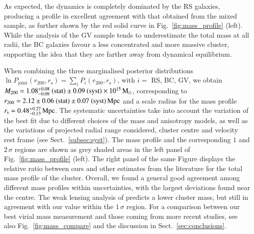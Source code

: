 \documentclass{aa}
\begin{document}
As expected, the dynamics is completely dominated by the RS galaxies, producing a profile in excellent agreement with that obtained from the mixed sample, as further shown by the red solid curve in Fig.~\ref{fig:mass_profile} (left). While the analysis of the GV sample tends to underestimate the total mass at all radii, the BC galaxies favour a less concentrated and more massive cluster, supporting the idea that they are farther away from dynamical equilibrium.


When combining the three marginalised posterior distributions $\ln P_\text{joint}(r_{200},r_\text{s}) = \sum_i  P_i(r_{200},r_\text{s})$, with $i = $ RS, BC, GV, we obtain $M_{200} = 1.08_{-0.09}^{+0.08}~({\rm stat}) \pm 0.09~({\rm syst}) \times 10^{15} \, \mathrm{M}_\odot $, corresponding to $r_{200}=2.12 \pm 0.06~({\rm stat})\pm0.07 ~({\rm syst}) \, \mathrm{Mpc}$ and a scale radius for the mass profile $r_{\rm s} =0.48^{+0.27}_{-0.13} \, \mathrm{Mpc}$. The systematic uncertainties take into account the variation of the best fit due to different choices of the mass and anisotropy models, as well as the variations of projected radial range considered, cluster centre and velocity rest frame (see Sect.~\ref{subsec:syst}). The mass profile and the corresponding $1$ and $2\,\sigma$ regions are shown as grey shaded areas in the left panel of Fig.~\ref{fig:mass_profile} (left). The right panel of the same Figure displays the relative ratio between ours and other estimates from the literature for the total mass profile of the cluster. Overall, we found a general good agreement among different mass profiles within uncertainties, with the largest deviations found near the centre. The weak lensing analysis of \cite{Gavazzi_2009} predicts a lower cluster mass, but still in agreement with our value within the $1\,\sigma$ region. For a comparison between our best virial mass measurement and those coming from more recent studies, see also Fig.~\ref{fig:mass_compare} and the discussion in Sect.~\ref{sec:conclusions}. %
\end{document}
